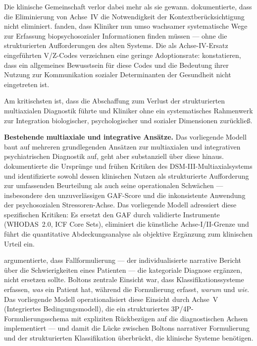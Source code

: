\documentclass[11pt,a4paper]{article}
\begin{document}
Die klinische Gemeinschaft verlor dabei mehr als sie gewann. \citet{Probst2014} dokumentierte, dass die Eliminierung von Achse~IV \glqq die Notwendigkeit der Kontextber\"ucksichtigung nicht eliminiert\grqq{}. \citet{Kress2014} fanden, dass Kliniker nun \glqq umso wachsamer systematische Wege zur Erfassung biopsychosozialer Informationen\grqq{} finden m\"ussen --- ohne die strukturierten Aufforderungen des alten Systems. Die als Achse-IV-Ersatz eingef\"uhrten V/Z-Codes verzeichnen eine geringe Adoptionsrate: \citet{ErlichFirst2025} konstatieren, dass \glqq ein allgemeines Bewusstsein f\"ur diese Codes und die Bedeutung ihrer Nutzung zur Kommunikation sozialer Determinanten der Gesundheit nicht eingetreten ist\grqq{}.

Am kritischsten ist, dass die Abschaffung zum Verlust der strukturierten multiaxialen Diagnostik f\"uhrte und Kliniker ohne ein systematisches Rahmenwerk zur Integration biologischer, psychologischer und sozialer Dimensionen zur\"ucklie\ss{}.

\textbf{Bestehende multiaxiale und integrative Ans\"atze.} Das vorliegende Modell baut auf mehreren grundlegenden Ans\"atzen zur multiaxialen und integrativen psychiatrischen Diagnostik auf, geht aber substanziell \"uber diese hinaus. \citet{Williams1985} dokumentierte die Urspr\"unge und fr\"uhen Kritiken des DSM-III-Multiaxialsystems und identifizierte sowohl dessen klinischen Nutzen als strukturierte Aufforderung zur umfassenden Beurteilung als auch seine operationalen Schw\"achen --- insbesondere den unzuverl\"assigen GAF-Score und die inkonsistente Anwendung der psychosozialen Stressoren-Achse. Das vorliegende Modell adressiert diese spezifischen Kritiken: Es ersetzt den GAF durch validierte Instrumente (WHODAS~2.0, ICF Core Sets), eliminiert die k\"unstliche Achse-I/II-Grenze und f\"uhrt die quantitative Abdeckungsanalyse als objektive Erg\"anzung zum klinischen Urteil ein.

\citet{Bolton2008} argumentierte, dass Fallformulierung --- der individualisierte narrative Bericht \"uber die Schwierigkeiten eines Patienten --- die kategoriale Diagnose erg\"anzen, nicht ersetzen sollte. Boltons zentrale Einsicht war, dass Klassifikationssysteme erfassen, \textit{was} ein Patient hat, w\"ahrend die Formulierung erfasst, \textit{warum} und \textit{wie}. Das vorliegende Modell operationalisiert diese Einsicht durch Achse~V (Integriertes Bedingungsmodell), die ein strukturiertes 3P/4P-Formulierungsschema mit expliziten R\"uckbez\"ugen auf die diagnostischen Achsen implementiert --- und damit die L\"ucke zwischen Boltons narrativer Formulierung und der strukturierten Klassifikation \"uberbr\"uckt, die klinische Systeme ben\"otigen.
\end{document}
